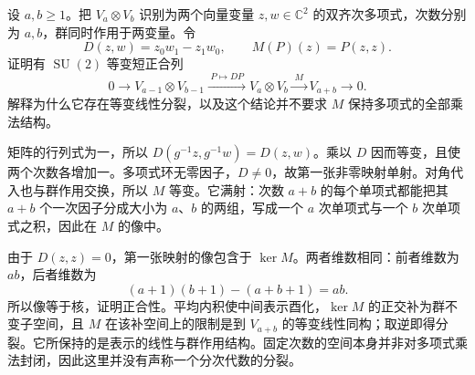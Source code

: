 \begin{exercise}\label{g1:ex:polynomial-product-exact-sequence}
	设 \(a,b\ge1\)。把 \(V_a\otimes V_b\) 识别为两个向量变量 \(z,w\in\mathbb C^2\) 的双齐次多项式，次数分别为 \(a,b\)，群同时作用于两变量。令
	\[
		D(z,w)=z_0w_1-z_1w_0,\qquad
		M(P)(z)=P(z,z).
	\]
	证明有 \(\operatorname{SU}(2)\) 等变短正合列
	\[
		0\longrightarrow V_{a-1}\otimes V_{b-1}
		\xrightarrow{\;P\mapsto DP\;}V_a\otimes V_b
		\xrightarrow{\;M\;}V_{a+b}\longrightarrow0.
	\]
	解释为什么它存在等变线性分裂，以及这个结论并不要求 \(M\) 保持多项式的全部乘法结构。
\end{exercise}
\begin{solution}
	矩阵的行列式为一，所以 \(D(g^{-1}z,g^{-1}w)=D(z,w)\)。乘以 \(D\) 因而等变，且使两个次数各增加一。多项式环无零因子，\(D\ne0\)，故第一张非零映射单射。对角代入也与群作用交换，所以 \(M\) 等变。它满射：次数 \(a+b\) 的每个单项式都能把其 \(a+b\) 个一次因子分成大小为 \(a\)、\(b\) 的两组，写成一个 \(a\) 次单项式与一个 \(b\) 次单项式之积，因此在 \(M\) 的像中。

	由于 \(D(z,z)=0\)，第一张映射的像包含于 \(\ker M\)。两者维数相同：前者维数为 \(ab\)，后者维数为
	\[
		(a+1)(b+1)-(a+b+1)=ab.
	\]
	所以像等于核，证明正合性。平均内积使中间表示酉化，\(\ker M\) 的正交补为群不变子空间，且 \(M\) 在该补空间上的限制是到 \(V_{a+b}\) 的等变线性同构；取逆即得分裂。它所保持的是表示的线性与群作用结构。固定次数的空间本身并非对多项式乘法封闭，因此这里并没有声称一个分次代数的分裂。
\end{solution}
